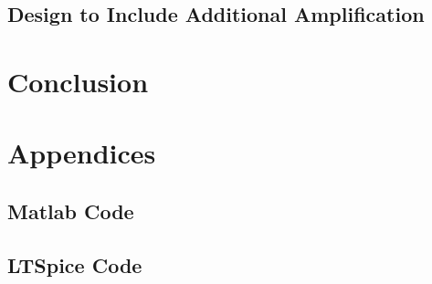 \documentclass[12pt]{article}
\begin{document}
\subsection{Design to Include Additional Amplification}



\section{Conclusion}






\appendix
\section*{Appendices}\label{appendix:main}
\renewcommand{\thesubsection}{\Alph{subsection}}

\subsection{Matlab Code}

\subsection{LTSpice Code}

\end{document}
